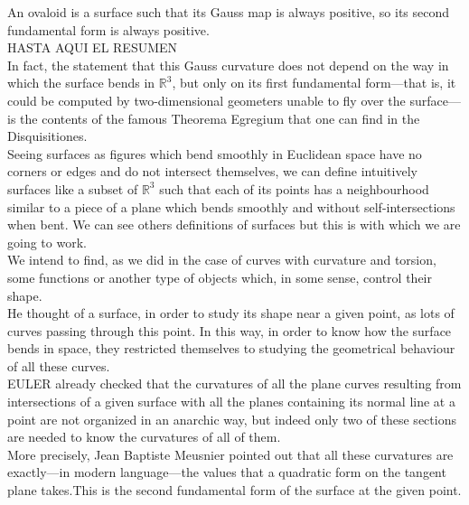 An ovaloid is a surface such that its Gauss map is always positive, so its second fundamental form is always positive.
${ }$\\



HASTA AQUI EL RESUMEN
${ }$\\




In fact, the statement that this Gauss curvature does not depend on the way in which the surface bends in $\mathbb{R}^3$, but only on its first fundamental form—that is, it could be computed by two-dimensional geometers unable to fly over the surface—is the contents of the famous Theorema Egregium that one can find in the Disquisitiones.
${ }$\\










Seeing surfaces as figures which bend smoothly in Euclidean space have no corners or edges and do not intersect themselves, we can define intuitively surfaces like a subset of $\mathbb{R}^3$ such that each of its points has a neighbourhood similar to a piece of a plane which bends smoothly and without self-intersections when bent. We can see others definitions of surfaces but this is with which we are going to work.
${ }$\\

We intend to find, as we did in the case of curves with curvature and torsion, some functions or another type of objects which, in some sense, control their shape.
${ }$\\

He thought of a surface, in order to study its shape near a given point, as lots of curves passing through this point. In this way, in order to know how the surface bends in space, they restricted themselves to studying the geometrical behaviour of all these curves.
${ }$\\

EULER already checked that the curvatures of all the plane curves resulting from intersections of a given surface with all the planes containing its normal line at a point are not organized in an anarchic way, but indeed only two of these sections are needed to know the curvatures of all of them.
${ }$\\

More precisely, Jean Baptiste Meusnier pointed out that all these curvatures are exactly—in modern language—the values that a quadratic form on the tangent plane takes.This is the second fundamental form of the surface at the given point.
${ }$\\

